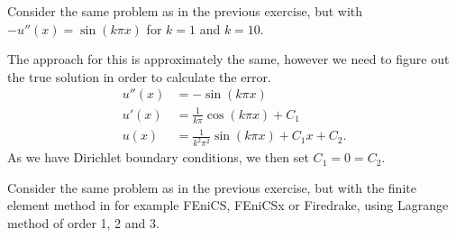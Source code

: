 \begin{exercise}
    Consider the same problem as in the previous exercise, but with $ -u''(x) = \sin(k\pi x)$ for $k = 1$ and $k = 10$.
\end{exercise}

\begin{solution}
    The approach for this is approximately the same, however we need to figure out the true solution in order to calculate the error.
    \begin{align*}
        u''(x) &= -\sin(k\pi x) \\
        u'(x) &= \frac{1}{k\pi} \cos(k\pi x) + C_1 \\
        u(x) &= \frac{1}{k^2\pi^2} \sin(k\pi x) + C_1 x + C_2.
    \end{align*}
    As we have Dirichlet boundary conditions, we then set $C_1 = 0 = C_2$.
\end{solution}

\begin{exercise}
    Consider the same problem as in the previous exercise, but with the finite element method in for example FEniCS, FEniCSx or Firedrake, using Lagrange method of order 1, 2 and 3.
\end{exercise}

